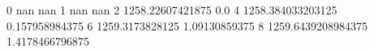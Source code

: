 0 nan nan
1 nan nan
2 1258.22607421875 0.0
4 1258.384033203125 0.157958984375
6 1259.3173828125 1.09130859375
8 1259.6439208984375 1.4178466796875
